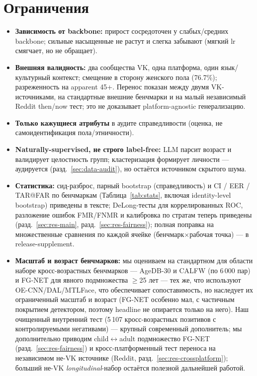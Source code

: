\documentclass[journal]{IEEEtran}
\begin{document}
\section{Ограничения}\label{sec:limitations}
\begin{itemize}[leftmargin=1.2em]
\item \textbf{Зависимость от backbone:} прирост сосредоточен у слабых/средних backbone; сильные насыщенные не растут и слегка забывают (мягкий lr смягчает, но не обращает).
\item \textbf{Внешняя валидность:} два сообщества VK, одна платформа, один язык/культурный контекст; смещение в сторону женского пола (76.7\%); разреженность на apparent 45+. Перенос показан между двумя VK-источниками, на стандартные внешние бенчмарки и на малый независимый Reddit then/now тест; это не доказывает platform-agnostic генерализацию.
\item \textbf{Только кажущиеся атрибуты} в аудите справедливости (оценка, не самоидентификация пола/этничности).
\item \textbf{Naturally-supervised, не строго label-free:} LLM парсит возраст и валидирует целостность групп; кластеризация формирует личности --- аудируется (разд.~\ref{sec:data-audit}), но остаётся источником скрытого шума.
\item \textbf{Статистика:} сид-разброс, парный bootstrap (справедливость) и CI / EER / TAR@FAR по бенчмаркам (Таблица~\ref{tab:stats}, включая identity-level bootstrap) приведены в тексте; DeLong-тесты для коррелированных ROC, разложение ошибок FMR/FNMR и калибровка по стратам теперь приведены (разд.~\ref{sec:res-main}, разд.~\ref{sec:res-fairness}); полная поправка на множественные сравнения по каждой ячейке (бенчмарк$\times$рабочая точка) --- в release-supplement.
\item \textbf{Масштаб и возраст бенчмарков:} мы оцениваем на стандартном для области наборе кросс-возрастных бенчмарков --- AgeDB-30 и CALFW (по 6\,000 пар) и FG-NET для явного подмножества $\geq$25 лет --- тех же, что используют OE-CNN/DAL/MTLFace, что обеспечивает сопоставимость, но наследует их ограниченный масштаб и возраст (FG-NET особенно мал, с частичным покрытием детектором, поэтому headline не опирается только на него). Наш очищенный внутренний тест (5\,107 кросс-возрастных позитивов с контролируемыми негативами) --- крупный современный дополнитель; мы дополнительно приводим child$\leftrightarrow$adult подмножество FG-NET (разд.~\ref{sec:res-fairness}) и кросс-платформенный тест переноса на независимом не-VK источнике (Reddit, разд.~\ref{sec:res-crossplatform}); больший не-VK \emph{longitudinal}-набор остаётся полезной дальнейшей работой.

\end{itemize}
\end{document}
